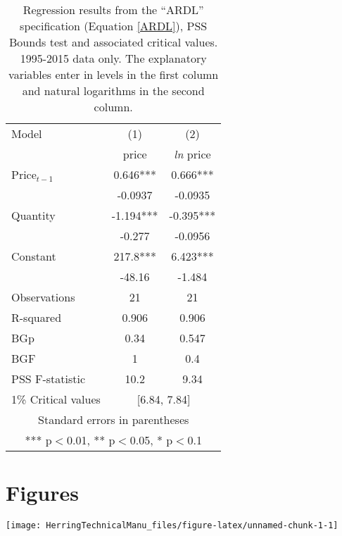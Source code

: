 \documentclass[]{article}
\let\origfigure\figure
\let\endorigfigure\endfigure
\renewenvironment{figure}[1][2] {
    \expandafter\origfigure\expandafter[H]
} {
    \endorigfigure
}
\begin{document}
\begin{table}[htbp]
\begin{center}
\caption{Regression results from the ``ARDL'' specification (Equation \ref{ARDL}), PSS Bounds test and associated critical values.  1995-2015 data only. The explanatory variables enter in levels in the first column and natural logarithms in the second column.  \label{ardl_regression}}
\begin{tabular}{lcc} \hline
Model       &   (1) &   (2)     \\
    &   price & \textit{ln} price   \\\hline
Price$_{t-1}$       &   0.646***    &   0.666***    \\
        &   -0.0937 &   -0.0935 \\
Quantity        &   -1.194***   &   -0.395***   \\
        &   -0.277  &   -0.0956 \\
Constant        &   217.8***    &   6.423***    \\
        &   -48.16  &   -1.484  \\
Observations        &   21  &   21  \\
R-squared       &   0.906   &   0.906   \\
BGp     &   0.34    &   0.547   \\
BGF     &   1   &   0.4 \\
PSS F-statistic &   10.2    &   9.34    \\\hline
1\% Critical values &\multicolumn{2}{c}{[6.84, 7.84]} \\\hline
\multicolumn{3}{c}{ Standard errors in parentheses} \\
\multicolumn{3}{c}{ *** p$<$0.01, ** p$<$0.05, * p$<$0.1} \\\hline
\end{tabular}
\end{center}
\end{table}

\newpage

\section{Figures}\label{figures}

\listoffigures

\newpage

\begin{figure}

{\centering \texttt{[image: HerringTechnicalManu\_files/figure-latex/unnamed-chunk-1-1]} 

}

\caption{Modeled herring average weight (population >180mm in length) to tuna growth relationship. See text (Herring-tuna relationship model section) for derivation. \label{herringtuna}}\label{fig:unnamed-chunk-1}
\end{figure}\newpage
\end{document}
